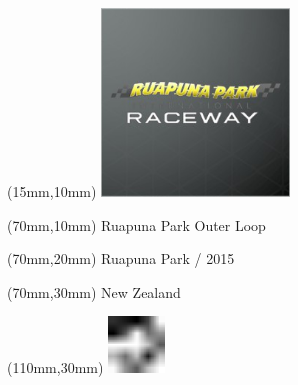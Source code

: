 \null\newpage
\begin{textblock*}{50mm}(15mm,10mm)%
\includegraphics[width=50mm]{LG/RUPU.png}
\end{textblock*}
\begin{textblock*}{130mm}(70mm,10mm)%
{\fontsize{20}{20}\selectfont Ruapuna Park Outer Loop}\\
\end{textblock*}
\begin{textblock*}{120mm}(70mm,20mm)%
{\fontsize{16}{16}\selectfont Ruapuna Park / 2015}\\
\end{textblock*}
\begin{textblock*}{120mm}(70mm,30mm)%
{\fontsize{12}{12}\selectfont New Zealand}
\end{textblock*}
\begin{textblock*}{30mm}(110mm,30mm)%
\centering
\includegraphics[height=15mm]{icons/fa-rotate-left.pdf}
\end{textblock*}
